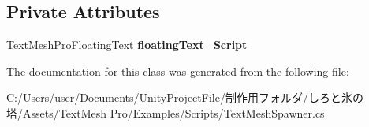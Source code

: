 \subsection*{Private Attributes}
\begin{DoxyCompactItemize}
\item 
\mbox{\label{class_t_m_pro_1_1_examples_1_1_text_mesh_spawner_a1c82276ccc1ddd5761a78b6e48be8541}} 
\hyperlink{class_t_m_pro_1_1_examples_1_1_text_mesh_pro_floating_text}{Text\+Mesh\+Pro\+Floating\+Text} {\bfseries floating\+Text\+\_\+\+Script}
\end{DoxyCompactItemize}


The documentation for this class was generated from the following file\+:\begin{DoxyCompactItemize}
\item 
C\+:/\+Users/user/\+Documents/\+Unity\+Project\+File/制作用フォルダ/しろと氷の塔/\+Assets/\+Text\+Mesh Pro/\+Examples/\+Scripts/Text\+Mesh\+Spawner.\+cs\end{DoxyCompactItemize}
